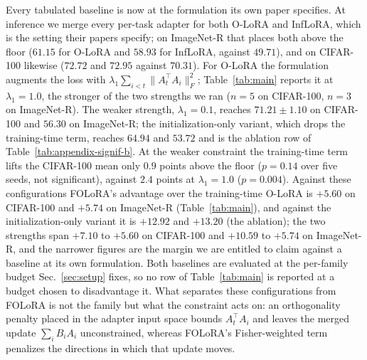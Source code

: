 Every tabulated baseline is now at the formulation its own paper specifies. At inference we
merge every per-task adapter for both O-LoRA and InfLoRA, which is the setting their papers
specify; on ImageNet-R that places both above the floor ($61.15$ for O-LoRA and $58.93$ for
InfLoRA, against $49.71$), and on CIFAR-100 likewise ($72.72$ and $72.95$ against $70.31$).
For O-LoRA the formulation augments the loss with
$\lambda_1\sum_{i<t}\lVert A_t^{\top}A_i\rVert_F^2$; Table~\ref{tab:main} reports it at
$\lambda_1{=}1.0$, the stronger of the two strengths we ran ($n{=}5$ on CIFAR-100, $n{=}3$ on
ImageNet-R). The weaker strength, $\lambda_1{=}0.1$, reaches $71.21\pm1.10$ on CIFAR-100 and
$56.30$ on ImageNet-R; the initialization-only variant, which drops the training-time term,
reaches $64.94$ and $53.72$ and is the ablation row of
Table~\ref{tab:appendix-signif-b}. At the weaker constraint the training-time term lifts the
CIFAR-100 mean only $0.9$ points above the floor ($p=0.14$ over five seeds, not significant),
against $2.4$ points at $\lambda_1{=}1.0$ ($p=0.004$). Against these configurations FOLoRA's
advantage over the training-time O-LoRA is $+5.60$ on CIFAR-100 and $+5.74$ on ImageNet-R
(Table~\ref{tab:main}), and against the initialization-only variant it is $+12.92$ and
$+13.20$ (the ablation); the two strengths span $+7.10$ to $+5.60$ on CIFAR-100 and $+10.59$
to $+5.74$ on ImageNet-R, and the narrower figures are the margin we are entitled to claim
against a baseline at its own formulation. Both baselines are evaluated at the per-family
budget Sec.~\ref{sec:setup} fixes, so no row of Table~\ref{tab:main} is reported at a budget
chosen to disadvantage it. What separates these configurations from FOLoRA is
not the family but what the constraint acts on: an orthogonality penalty placed in the
adapter input space bounds $A_t^{\top}A_i$ and leaves the merged update $\sum_i B_iA_i$
unconstrained, whereas FOLoRA's Fisher-weighted term penalizes the directions in which that
update moves.


